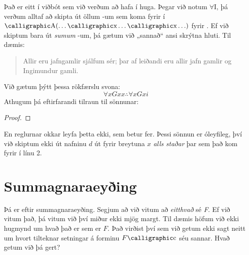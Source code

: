 Það er eitt í viðbót sem við verðum að hafa í huga. Þegar við notum $\forall$I, þá verðum alltaf að skipta út öllum -um sem koma fyrir í $\meta{A}(\ldots \meta{x}\ldots\meta{x}\ldots)$ fyrir . Ef við skiptum bara út \emph{sumum} -um, þá gætum við „sannað“ ansi skrýtna hluti. Til dæmis:
	\begin{quote}
	Allir eru jafngamlir sjálfum sér; þar af leiðandi eru allir jafn gamlir og Ingimundur gamli.
	\end{quote}
Við gætum þýtt þessa rökfærslu svona:	
$$\forall x Gxx \therefore \forall x Gxi$$
Athugum þá eftirfarandi tilraun til sönnunar:
\begin{proof}
\end{proof}
En reglurnar okkar leyfa þetta ekki, sem betur fer. Þessi sönnun er óleyfileg, því við skiptum ekki út nafninu $d$ út fyrir breytuna $x$ \emph{alls staðar} þar sem það kom fyrir í línu 2.

\section{Summagnaraeyðing}

Þá er eftir summagnaraeyðing. Segjum að við vitum að \emph{eitthvað} sé \emph{F}. Ef við vitum það, þá vitum við því miður ekki mjög margt. Til dæmis höfum við ekki hugmynd um hvað það er sem er $F$. Það virðist því sem við getum ekki sagt neitt um hvort tilteknar setningar á forminu $F\meta{c}$ séu sannar. Hvað getum við þá gert?

